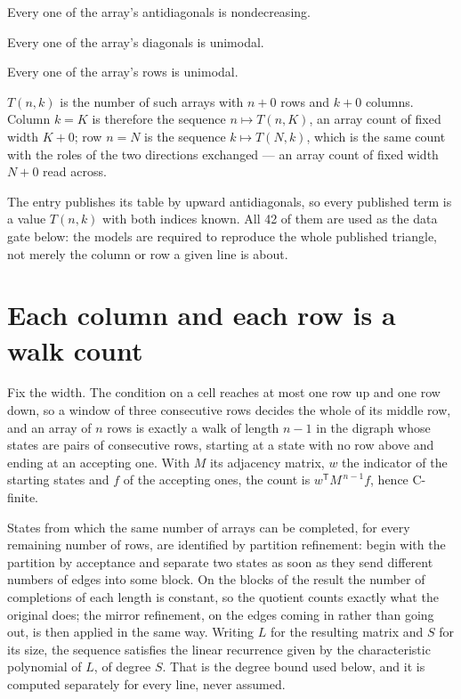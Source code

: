 \documentclass[11pt]{article}
\theoremstyle{definition}
\begin{document}
Every one of the array's antidiagonals is nondecreasing.

Every one of the array's diagonals is unimodal.

Every one of the array's rows is unimodal.

$T(n,k)$ is the number of such arrays with $n + 0$ rows and $k + 0$ columns. Column $k = K$ is therefore the sequence $n \mapsto T(n,K)$, an array count of fixed width $K + 0$; row $n = N$ is the sequence $k \mapsto T(N,k)$, which is the same count with the roles of the two directions exchanged --- an array count of fixed width $N + 0$ read across.

The entry publishes its table by upward antidiagonals, so every published term is a value $T(n,k)$ with both indices known. All 42 of them are used as the data gate below: the models are required to reproduce the whole published triangle, not merely the column or row a given line is about.

\section{Each column and each row is a walk count}

Fix the width. The condition on a cell reaches at most one row up and one row down, so a window of three consecutive rows decides the whole of its middle row, and an array of $n$ rows is exactly a walk of length $n-1$ in the digraph whose states are pairs of consecutive rows, starting at a state with no row above and ending at an accepting one. With $M$ its adjacency matrix, $w$ the indicator of the starting states and $f$ of the accepting ones, the count is $w^{\mathsf T}M^{\,n-1}f$, hence C-finite.

States from which the same number of arrays can be completed, for every remaining number of rows, are identified by partition refinement: begin with the partition by acceptance and separate two states as soon as they send different numbers of edges into some block. On the blocks of the result the number of completions of each length is constant, so the quotient counts exactly what the original does; the mirror refinement, on the edges coming in rather than going out, is then applied in the same way. Writing $L$ for the resulting matrix and $S$ for its size, the sequence satisfies the linear recurrence given by the characteristic polynomial of $L$, of degree $S$. That is the degree bound used below, and it is computed separately for every line, never assumed.
\end{document}
